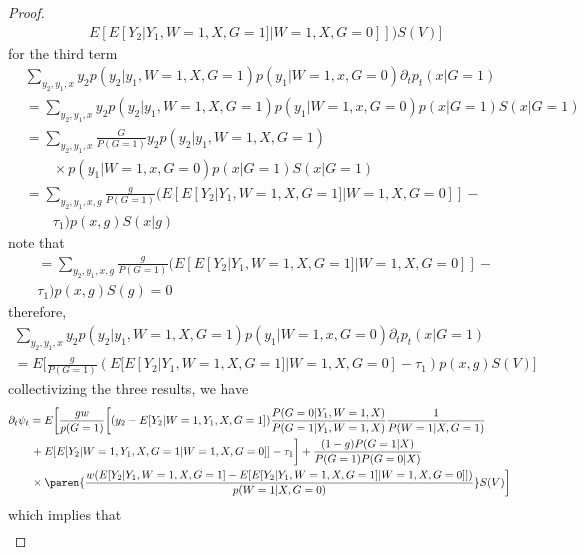 \documentclass[uplatex,dvipdfmx]{jsarticle}
\begin{document}
\begin{proof}
\begin{align*}
    &E [ E[ Y_2 | Y_1 , W =1 , X, G =1 ] | W=1, X, G= 0 ]] )  S(  V) \biggr] 
    \end{align*}
    for the third term
    \begin{align*}
    &\sum_ { y_2 ,y_1,x} y_2  p ( y_2| y_1 , W= 1, X , G= 1) p ( y_1 | W =1 , x, G= 0 ) \partial_t p_t( x | G =1 )\\
    &= \sum_ { y_2 ,y_1,x} y_2  p ( y_2| y_1 , W= 1, X , G= 1) p ( y_1 | W =1 , x, G= 0 ) p( x | G =1 ) S( x | G= 1) \\
    &= \sum_ { y_2 , y_1, x}      \frac{ G } { P(G =1 ) }   y_2  p ( y_2| y_1 , W= 1, X , G= 1)\\
    &\qquad\times p ( y_1 | W =1 , x, G= 0 ) p( x | G =1 ) S( x | G= 1) \\
    &= \sum_ { y_2 , y_1, x, g}      \frac{ g } { P(G =1 ) }   (E[ E[Y_2| Y_1,  W =1, X, G = 1 ] | W =1 , X, G = 0 ]]  - \\
    &\qquad \tau_1 ) p( x , g ) S( x | g)
    \end{align*}
    note that
    \begin{align*}
    &= \sum_ { y_2 , y_1, x, g}      \frac{ g } { P(G =1 ) }   (E[ E[Y_2| Y_1,  W =1, X, G = 1 ] | W =1 , X, G = 0 ]]  - \\
    &\tau_1) p( x , g ) S(  g) = 0
    \end{align*}
    therefore,
    \begin{align*}
    \sum_ { y_2 ,y_1,x} y_2  p ( y_2| y_1 , W= 1, X , G= 1) p ( y_1 | W =1 , x, G= 0 ) \partial_t p_t( x | G =1 )\\
    = E\biggl[      \frac{ g } { P(G =1 ) }   (E[ E[Y_2| Y_1,  W =1, X, G = 1 ] | W =1 , X, G = 0 ]  - \tau_1 ) p( x , g ) S(  V) \biggr]
    \end{align*}
    collectivizing the three results, we have
    \begin{align*}
    &\partial_t \psi_t = E \biggl[  \frac{ g w }{ p(G=1) } \biggl[ (y_2 - E[ Y_2 | W=1 , Y_1 , X, G =1]  ) \frac{ P( G =0 | Y_1 , W=1 , X ) }{ P(G=1 | Y_1 , W=1 , X ) }\frac{1}{P( W=1 | X , G=1)}  \\
    & \qquad+ E [ E[ Y_2 | W = 1, Y_1 , X, G =1 | W =1, X, G= 0 ] ] - \tau_1    \biggr]  + \frac{ (1- g) P(G = 1|X)   }{ P(G= 1) P ( G =0 |X) } \\
    &\qquad\times\paren{ \frac{ w ( E [ Y _ 2 | Y_1,W =1 , X, G =1 ] - E [ E[ Y_2 | Y_1, W=1, X, G=1 ] | W =1, X, G= 0 ] ] ) }{ p ( W =1| X, G =0 ) } }S(V) \biggr] 
    \end{align*}
    which implies that
    \begin{align*}

\end{align*}
\end{proof}
\end{document}
